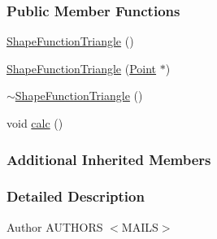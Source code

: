 \subsubsection*{Public Member Functions}
\begin{DoxyCompactItemize}
\item 
\hyperlink{classmknix_1_1_shape_function_triangle_a97c6fcf1cd39f8563c561d5604bc2f70}{Shape\-Function\-Triangle} ()
\item 
\hyperlink{classmknix_1_1_shape_function_triangle_a209c1e99a4686ccdc88154a054405857}{Shape\-Function\-Triangle} (\hyperlink{classmknix_1_1_point}{Point} $\ast$)
\item 
\hyperlink{classmknix_1_1_shape_function_triangle_ae940dedb08ab37bbbcd253cd202f12c2}{$\sim$\-Shape\-Function\-Triangle} ()
\item 
void \hyperlink{classmknix_1_1_shape_function_triangle_a7ebaa0c670cb55ee1988d9a0a5400f62}{calc} ()
\end{DoxyCompactItemize}
\subsubsection*{Additional Inherited Members}


\subsubsection{Detailed Description}
\begin{DoxyAuthor}{Author}
A\-U\-T\-H\-O\-R\-S $<$\-M\-A\-I\-L\-S$>$ 
\end{DoxyAuthor}


